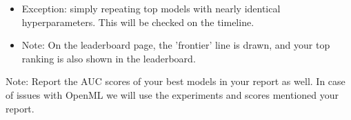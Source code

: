 \documentclass[11pt]{article}
\providecommand{\tightlist}{%
      \setlength{\itemsep}{0pt}\setlength{\parskip}{0pt}}
\begin{document}
\begin{itemize}
\begin{itemize}
    \begin{itemize}
    \tightlist
    \item
      Exception: simply repeating top models with nearly identical
      hyperparameters. This will be checked on the timeline.
    \item
      Note: On the leaderboard page, the 'frontier' line is drawn, and
      your top ranking is also shown in the leaderboard.
    \end{itemize}
  \end{itemize}
\end{itemize}

Note: Report the AUC scores of your best models in your report as well.
In case of issues with OpenML we will use the experiments and scores
mentioned your report.


    
    
    
    
\end{document}
